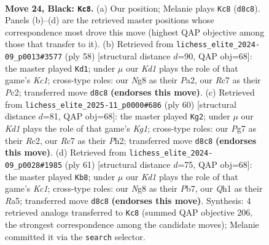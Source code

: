 \documentclass[11pt]{article}
\begin{document}
\clearpage

\begin{figure}[p]\centering
\begin{subfigure}{0.46\textwidth}\centering
\resizebox{\linewidth}{!}{%
\newchessgame
\chessboard[
  setfen={3k2nr/2r3p1/p2Q4/2p3Pp/5P1P/2P5/PP3K2/RNB4q b - - 0 24},
  showmover=false,
  pgfstyle=straightmove, color=movearrow, markmove={d8-c8}
]}
\caption{}
\end{subfigure}\hfill
\begin{subfigure}{0.46\textwidth}\centering
\resizebox{\linewidth}{!}{%
\newchessgame
\chessboard[
  setfen={8/4prk1/p2p1p2/1p3PpQ/8/q5P1/P1P5/2K4R w - - 2 30},
  showmover=false,
  pgfstyle=straightmove, color=movearrow, markmove={c1-d1}
]}
\caption{}
\end{subfigure}
\\[4pt]
\begin{subfigure}{0.46\textwidth}\centering
\resizebox{\linewidth}{!}{%
\newchessgame
\chessboard[
  setfen={3r4/p1N1r1pk/1p5p/1Q3p2/3Pp3/4q1P1/2R4P/2R3K1 w - - 0 31},
  showmover=false,
  pgfstyle=straightmove, color=movearrow, markmove={g1-g2}
]}
\caption{}
\end{subfigure}\hfill
\begin{subfigure}{0.46\textwidth}\centering
\resizebox{\linewidth}{!}{%
\newchessgame
\chessboard[
  setfen={r1k5/1p6/4Qp2/r3pP2/4P3/1PP5/1P3qPP/1K2R3 b - - 2 31},
  showmover=false,
  pgfstyle=straightmove, color=movearrow, markmove={c8-b8}
]}
\caption{}
\end{subfigure}
\caption{\textbf{Move 24, Black: \texttt{Kc8}.} (a) Our position; Melanie plays \texttt{Kc8} (\texttt{d8c8}). Panels (b)--(d) are the retrieved master positions whose correspondence most drove this move (highest QAP objective among those that transfer to it). (b) Retrieved from \texttt{lichess\_elite\_2024-09\_p0013\#3577} (ply 58) [structural distance $d$=90, QAP obj=68]: the master played \texttt{Kd1}; under $\mu$ our \emph{Kd1} plays the role of that game's \emph{Kc1}; cross-type roles: our \emph{N}g8 as their \emph{P}a2, our \emph{R}c7 as their \emph{P}c2; transferred move \texttt{d8c8} \textbf{(endorses this move)}. (c) Retrieved from \texttt{lichess\_elite\_2025-11\_p0000\#686} (ply 60) [structural distance $d$=81, QAP obj=68]: the master played \texttt{Kg2}; under $\mu$ our \emph{Kd1} plays the role of that game's \emph{Kg1}; cross-type roles: our \emph{P}g7 as their \emph{R}c2, our \emph{R}c7 as their \emph{P}h2; transferred move \texttt{d8c8} \textbf{(endorses this move)}. (d) Retrieved from \texttt{lichess\_elite\_2024-09\_p0028\#1985} (ply 61) [structural distance $d$=75, QAP obj=68]: the master played \texttt{Kb8}; under $\mu$ our \emph{Kd1} plays the role of that game's \emph{Kc1}; cross-type roles: our \emph{N}g8 as their \emph{P}b7, our \emph{Q}h1 as their \emph{R}a5; transferred move \texttt{d8c8} \textbf{(endorses this move)}. Synthesis: 4 retrieved analogs transferred to \texttt{Kc8} (summed QAP objective 206, the strongest correspondence among the candidate moves); Melanie committed it via the \texttt{search} selector.}
\label{fig:thought-m47}
\end{figure}
\end{document}
